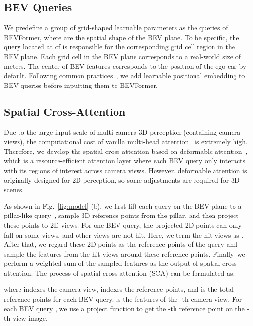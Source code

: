 \documentclass{article}
\begin{document}
\subsection{BEV Queries}\label{bev_queries}
We predefine a group of grid-shaped learnable parameters  as the queries of BEVFormer, where  are the spatial shape of the BEV plane. 
To be specific, the query  located at  of  is responsible for the corresponding grid cell region in the BEV plane. 
Each grid cell in the BEV plane corresponds to a real-world size of  meters. 
The center of BEV features corresponds to the position of the ego car by default.
Following common practices~\cite{gehring2017convolutional}, we add learnable positional embedding
to BEV queries  before inputting  them to BEVFormer. 


\subsection{Spatial Cross-Attention}\label{spatial_attention}
Due to the large input scale of multi-camera 3D perception (containing  camera views), the computational cost of vanilla multi-head attention~\cite{vaswani2017attention} is extremely high.
Therefore, we develop the spatial cross-attention based on deformable attention~\cite{zhu2020deformable}, which is a resource-efficient attention layer where each BEV query  only interacts with its regions of interest  across camera views. 
However, deformable attention is originally designed for 2D perception, so some adjustments are required for 3D scenes.


As shown in Fig.~\ref{fig:model} (b),
we first lift each query on the BEV plane to
a pillar-like query~\cite{lang2019pointpillars}, sample  3D reference points from the pillar, and then project these points to 2D views. For one BEV query, the projected 2D points can only fall on some views, and other views are not hit. Here, we term the hit views as .
After that, we regard these 2D points
as the reference points of the query  and sample the features from the hit views  around these
reference points.
Finally, we perform a weighted sum of the sampled features as the output of spatial cross-attention.
The process of spatial cross-attention (SCA) can be formulated as:

where  indexes the camera view,  indexes the reference points, and  is the total reference points for each BEV query.  is the features of the -th camera view. For each BEV query , we use a project function  to get the -th reference point on the -th view image.
\end{document}
